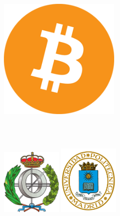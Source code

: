 
\begin{titlepage}

\begin{addmargin}[-1cm]{-3cm}
\begin{center}
\large

\hfill
\vfill

\begingroup
\color{Maroon}\spacedallcaps{\myTitle} \\ \bigskip %
\endgroup

\spacedlowsmallcaps{\myName} \\ %
\spacedlowsmallcaps{\myProf} \\

\vfill

\includegraphics[width=6cm]{gfx/bitcoin-logo} \\ \medskip %

\myDegree \\
\myUni \\ \bigskip

\myTime

\end{center}

\vfill

\includegraphics[width=3cm]{gfx/logo_etsiinf}
\hfill
\includegraphics[width=3cm]{gfx/upm-logo}

\end{addmargin}
\end{titlepage}
